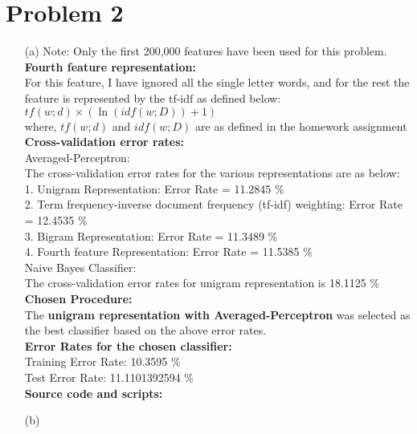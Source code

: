 \documentclass[fleqn]{article}
\begin{document}
\section{Problem 2}{}
\begin{itemize}
	\item[(a)]
		Note: Only the first 200,000 features have been used for this problem.\\
		\textbf{Fourth feature representation:} \\
		For this feature, I have ignored all the single letter words, and for the rest the feature is represented by the tf-idf as defined below: \\
			$tf(w; d) \times (\ln(idf(w;D)) + 1)$ \\
		where, $tf(w;d)$ and $idf(w;D)$ are as defined in the homework assignment \\

		\textbf{Cross-validation error rates:}\\
		Averaged-Perceptron:\\
		The cross-validation error rates for the various representations are as below:\\
		1. Unigram Representation: Error Rate = 11.2845 \% \\
		2. Term frequency-inverse document frequency (tf-idf) weighting: Error Rate = 12.4535 \% \\
		3. Bigram Representation: Error Rate = 11.3489 \% \\
		4. Fourth feature Representation: Error Rate = 11.5385 \% \\
		
		Naive Bayes Classifier:\\
		The cross-validation error rates for unigram representation is 18.1125 \% \\
		
		\textbf{Chosen Procedure:}\\
		The \textbf{unigram representation with Averaged-Perceptron} was selected as the best classifier based on the above error rates.\\

		\textbf{Error Rates for the chosen classifier:}\\
		Training Error Rate: 10.3595 \%\\
		Test Error Rate: 11.1101392594 \%\\

		\textbf{Source code and scripts:}\\
 
        \item[(b)] 
\end{itemize}
\end{document}
